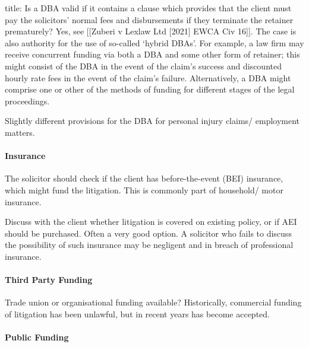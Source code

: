 \documentclass[
]{article}
\newenvironment{Shaded}{}{}
\newcommand{\NormalTok}[1]{#1}
\begin{document}
\begin{Shaded}
\begin{Highlighting}[]
\NormalTok{title: Is a DBA valid if it contains a clause which provides that the client must pay the solicitors’ normal fees and disbursements if they terminate the retainer prematurely?}
\NormalTok{Yes, see [[Zuberi v Lexlaw Ltd [2021] EWCA Civ 16]]. The case is also authority for the use of so{-}called ‘hybrid DBAs’. For example, a law firm may receive concurrent funding via both a DBA and some other form of retainer; this might consist of the DBA in the event of the claim’s success and discounted hourly rate fees in the event of the claim’s failure. Alternatively, a DBA might comprise one or other of the methods of funding for different stages of the legal proceedings.}
\end{Highlighting}
\end{Shaded}

\begin{Shaded}
\begin{Highlighting}[]
\NormalTok{Slightly different provisions for the DBA for personal injury claims/ employment matters.}
\end{Highlighting}
\end{Shaded}

\hypertarget{insurance}{%
\paragraph{Insurance}\label{insurance}}

The solicitor should check if the client has before-the-event (BEI)
insurance, which might fund the litigation. This is commonly part of
household/ motor insurance.

Discuss with the client whether litigation is covered on existing
policy, or if AEI should be purchased. Often a very good option. A
solicitor who fails to discuss the possibility of such insurance may be
negligent and in breach of professional insurance.

\hypertarget{third-party-funding}{%
\paragraph{Third Party Funding}\label{third-party-funding}}

Trade union or organisational funding available? Historically,
commercial funding of litigation has been unlawful, but in recent years
has become accepted.

\hypertarget{public-funding}{%
\paragraph{Public Funding}\label{public-funding}}
\end{document}
